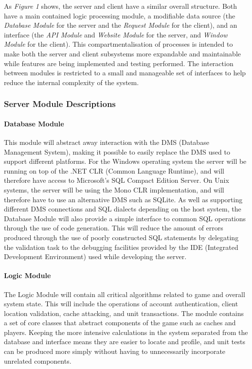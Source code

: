 As \emph{Figure 1} shows, the server and client have a similar overall structure. Both have a main contained logic processing module, a modifiable data source (the \emph{Database Module} for the server and the \emph{Request Module} for the client), and an interface (the \emph{API Module} and \emph{Website Module} for the server, and \emph{Window Module} for the client). This compartmentalisation of processes is intended to make both the server and client subsystems more expandable and maintainable while features are being implemented and testing performed. The interaction between modules is restricted to a small and manageable set of interfaces to help reduce the internal complexity of the system.

\subsubsection{Server Module Descriptions}
\paragraph{Database Module}
This module will abstract away interaction with the DMS (Database Management System), making it possible to easily replace the DMS used to support different platforms. For the Windows operating system the server will be running on top of the .NET CLR (Common Language Runtime), and will therefore have access to Microsoft's SQL Compact Edition Server. On Unix systems, the server will be using the Mono CLR implementation, and will therefore have to use an alternative DMS such as SQLite. As well as supporting different DMS connections and SQL dialects depending on the host system, the Database Module will also provide a simple interface to common SQL operations through the use of code generation. This will reduce the amount of errors produced through the use of poorly constructed SQL statements by delegating the validation task to the debugging facilities provided by the IDE (Integrated Development Environment) used while developing the server.

\paragraph{Logic Module}
The Logic Module will contain all critical algorithms related to game and overall system state. This will include the operations of account authentication, client location validation, cache attacking, and unit transactions. The module contains a set of core classes that abstract components of the game such as caches and players. Keeping the more intensive calculations in the system separated from the database and interface means they are easier to locate and profile, and unit tests can be produced more simply without having to unnecessarily incorporate unrelated components.

